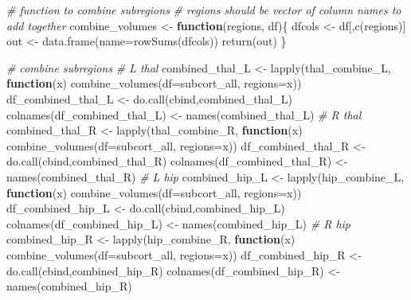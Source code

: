 \documentclass[
]{article}
\newenvironment{Shaded}{\begin{snugshade}}{\end{snugshade}}
\newcommand{\AttributeTok}[1]{\textcolor[rgb]{0.77,0.63,0.00}{#1}}
\newcommand{\CommentTok}[1]{\textcolor[rgb]{0.56,0.35,0.01}{\textit{#1}}}
\newcommand{\ControlFlowTok}[1]{\textcolor[rgb]{0.13,0.29,0.53}{\textbf{#1}}}
\newcommand{\FunctionTok}[1]{\textcolor[rgb]{0.00,0.00,0.00}{#1}}
\newcommand{\NormalTok}[1]{#1}
\newcommand{\OtherTok}[1]{\textcolor[rgb]{0.56,0.35,0.01}{#1}}
\begin{document}
\begin{Shaded}
\begin{Highlighting}[]
\CommentTok{\# function to combine subregions}
\CommentTok{\# regions should be vector of column names to add together}
\NormalTok{combine\_volumes }\OtherTok{\textless{}{-}} \ControlFlowTok{function}\NormalTok{(regions, df)\{}
\NormalTok{  dfcols }\OtherTok{\textless{}{-}}\NormalTok{ df[,}\FunctionTok{c}\NormalTok{(regions)]}
\NormalTok{  out }\OtherTok{\textless{}{-}} \FunctionTok{data.frame}\NormalTok{(}\AttributeTok{name=}\FunctionTok{rowSums}\NormalTok{(dfcols))}
  \FunctionTok{return}\NormalTok{(out)}
\NormalTok{\}}

\CommentTok{\# combine subregions}
\CommentTok{\# L thal}
\NormalTok{combined\_thal\_L }\OtherTok{\textless{}{-}} \FunctionTok{lapply}\NormalTok{(thal\_combine\_L, }\ControlFlowTok{function}\NormalTok{(x) }\FunctionTok{combine\_volumes}\NormalTok{(}\AttributeTok{df=}\NormalTok{subcort\_all, }\AttributeTok{regions=}\NormalTok{x)) }
\NormalTok{df\_combined\_thal\_L }\OtherTok{\textless{}{-}} \FunctionTok{do.call}\NormalTok{(cbind,combined\_thal\_L)}
\FunctionTok{colnames}\NormalTok{(df\_combined\_thal\_L) }\OtherTok{\textless{}{-}} \FunctionTok{names}\NormalTok{(combined\_thal\_L)}
\CommentTok{\# R thal}
\NormalTok{combined\_thal\_R }\OtherTok{\textless{}{-}} \FunctionTok{lapply}\NormalTok{(thal\_combine\_R, }\ControlFlowTok{function}\NormalTok{(x) }\FunctionTok{combine\_volumes}\NormalTok{(}\AttributeTok{df=}\NormalTok{subcort\_all, }\AttributeTok{regions=}\NormalTok{x)) }
\NormalTok{df\_combined\_thal\_R }\OtherTok{\textless{}{-}} \FunctionTok{do.call}\NormalTok{(cbind,combined\_thal\_R)}
\FunctionTok{colnames}\NormalTok{(df\_combined\_thal\_R) }\OtherTok{\textless{}{-}} \FunctionTok{names}\NormalTok{(combined\_thal\_R)}
\CommentTok{\# L hip}
\NormalTok{combined\_hip\_L }\OtherTok{\textless{}{-}} \FunctionTok{lapply}\NormalTok{(hip\_combine\_L, }\ControlFlowTok{function}\NormalTok{(x) }\FunctionTok{combine\_volumes}\NormalTok{(}\AttributeTok{df=}\NormalTok{subcort\_all, }\AttributeTok{regions=}\NormalTok{x)) }
\NormalTok{df\_combined\_hip\_L }\OtherTok{\textless{}{-}} \FunctionTok{do.call}\NormalTok{(cbind,combined\_hip\_L)}
\FunctionTok{colnames}\NormalTok{(df\_combined\_hip\_L) }\OtherTok{\textless{}{-}} \FunctionTok{names}\NormalTok{(combined\_hip\_L)}
\CommentTok{\# R hip}
\NormalTok{combined\_hip\_R }\OtherTok{\textless{}{-}} \FunctionTok{lapply}\NormalTok{(hip\_combine\_R, }\ControlFlowTok{function}\NormalTok{(x) }\FunctionTok{combine\_volumes}\NormalTok{(}\AttributeTok{df=}\NormalTok{subcort\_all, }\AttributeTok{regions=}\NormalTok{x)) }
\NormalTok{df\_combined\_hip\_R }\OtherTok{\textless{}{-}} \FunctionTok{do.call}\NormalTok{(cbind,combined\_hip\_R)}
\FunctionTok{colnames}\NormalTok{(df\_combined\_hip\_R) }\OtherTok{\textless{}{-}} \FunctionTok{names}\NormalTok{(combined\_hip\_R)}


\end{Highlighting}
\end{Shaded}
\end{document}
